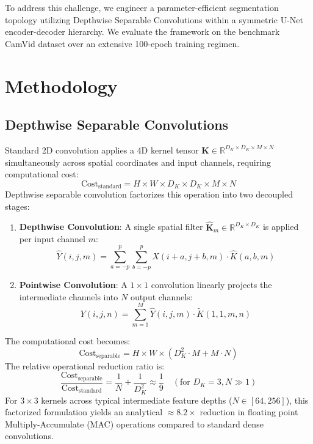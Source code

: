 \documentclass[conference]{IEEEtran}
\begin{document}
To address this challenge, we engineer a parameter-efficient segmentation topology utilizing Depthwise Separable Convolutions within a symmetric U-Net encoder-decoder hierarchy. We evaluate the framework on the benchmark CamVid dataset over an extensive 100-epoch training regimen.

\section{Methodology}

\subsection{Depthwise Separable Convolutions}
Standard 2D convolution applies a 4D kernel tensor $\mathbf{K} \in \mathbb{R}^{D_K \times D_K \times M \times N}$ simultaneously across spatial coordinates and input channels, requiring computational cost:
\begin{equation}
\text{Cost}_{\text{standard}} = H \times W \times D_K \times D_K \times M \times N
\end{equation}
Depthwise separable convolution factorizes this operation into two decoupled stages:
\begin{enumerate}
    \item \textbf{Depthwise Convolution}: A single spatial filter $\hat{\mathbf{K}}_m \in \mathbb{R}^{D_K \times D_K}$ is applied per input channel $m$:
    \begin{equation}
    \hat{Y}(i, j, m) = \sum_{a=-p}^{p} \sum_{b=-p}^{p} X(i+a, j+b, m) \cdot \hat{K}(a, b, m)
    \end{equation}
    \item \textbf{Pointwise Convolution}: A $1 \times 1$ convolution linearly projects the intermediate channels into $N$ output channels:
    \begin{equation}
    Y(i, j, n) = \sum_{m=1}^M \hat{Y}(i, j, m) \cdot \tilde{K}(1, 1, m, n)
    \end{equation}
\end{enumerate}
The computational cost becomes:
\begin{equation}
\text{Cost}_{\text{separable}} = H \times W \times \left( D_K^2 \cdot M + M \cdot N \right)
\end{equation}
The relative operational reduction ratio is:
\begin{equation}
\frac{\text{Cost}_{\text{separable}}}{\text{Cost}_{\text{standard}}} = \frac{1}{N} + \frac{1}{D_K^2} \approx \frac{1}{9} \quad (\text{for } D_K=3, N \gg 1)
\end{equation}
For $3 \times 3$ kernels across typical intermediate feature depths ($N \in [64, 256]$), this factorized formulation yields an analytical $\approx 8.2\times$ reduction in floating point Multiply-Accumulate (MAC) operations compared to standard dense convolutions.
\end{document}
